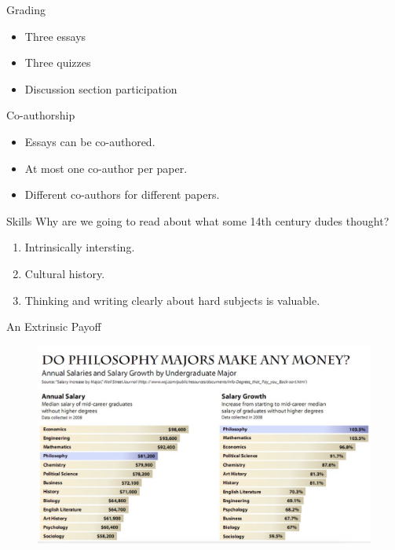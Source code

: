 \documentclass[
  17pt,
  letterpaper,
  ignorenonframetext,
  aspectratio=169,
]{beamer}
\providecommand{\tightlist}{%
  \setlength{\itemsep}{0pt}\setlength{\parskip}{0pt}}\usepackage{longtable,booktabs,array}
\begin{document}
\begin{frame}{Grading}
\protect\hypertarget{grading}{}
\begin{itemize}[<+->]
\tightlist
\item
  Three essays
\item
  Three quizzes
\item
  Discussion section participation
\end{itemize}
\end{frame}

\begin{frame}{Co-authorship}
\protect\hypertarget{co-authorship}{}
\begin{itemize}[<+->]
\tightlist
\item
  Essays can be co-authored.
\item
  At most one co-author per paper.
\item
  Different co-authors for different papers.
\end{itemize}
\end{frame}

\begin{frame}{Skills}
\protect\hypertarget{skills}{}
Why are we going to read about what some 14th century dudes thought?

\begin{enumerate}[<+->]
\tightlist
\item
  Intrinsically intersting.
\item
  Cultural history.
\item
  Thinking and writing clearly about hard subjects is valuable.
\end{enumerate}
\end{frame}

\begin{frame}{An Extrinsic Payoff}
\protect\hypertarget{an-extrinsic-payoff}{}
\begin{figure}

{\centering \includegraphics[width=\textwidth,height=0.7\textheight]{../images/philosophy_pay.jpeg}

}

\caption{~}

\end{figure}
\end{frame}
\end{document}
